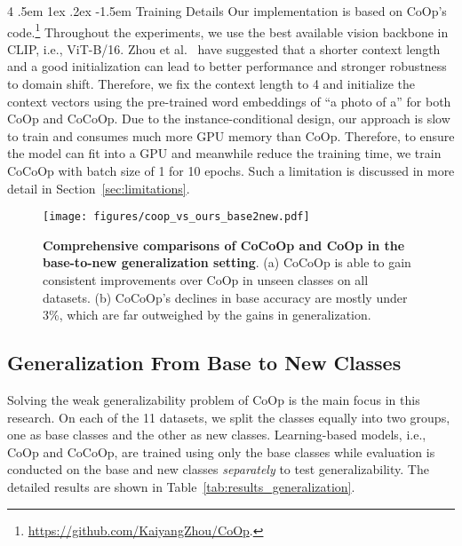 \documentclass[10pt,twocolumn,letterpaper]{article}
\makeatletter
\renewcommand\paragraph{
  \@startsection{paragraph} {4} {\z@} {.5em \@plus1ex \@minus.2ex} {-1.5em} {\normalfont\normalsize\bfseries} }
\makeatother
\begin{document}
\paragraph{Training Details}
Our implementation is based on CoOp's code.\footnote{\url{https://github.com/KaiyangZhou/CoOp}.} Throughout the experiments, we use the best available vision backbone in CLIP, i.e., ViT-B/16. Zhou et al.~\cite{zhou2021coop} have suggested that a shorter context length and a good initialization can lead to better performance and stronger robustness to domain shift. Therefore, we fix the context length to 4 and initialize the context vectors using the pre-trained word embeddings of ``a photo of a'' for both CoOp and CoCoOp. Due to the instance-conditional design, our approach is slow to train and consumes much more GPU memory than CoOp. Therefore, to ensure the model can fit into a GPU and meanwhile reduce the training time, we train CoCoOp with batch size of 1 for 10 epochs. Such a limitation is discussed in more detail in Section~\ref{sec:limitations}.


\begin{figure*}[t]
    \centering
    \texttt{[image: figures/coop\_vs\_ours\_base2new.pdf]}
    \caption{\textbf{Comprehensive comparisons of CoCoOp and CoOp in the base-to-new generalization setting}. (a) CoCoOp is able to gain consistent improvements over CoOp in unseen classes on all datasets. (b) CoCoOp's declines in base accuracy are mostly under 3\%, which are far outweighed by the gains in generalization.}
    \label{fig:coop_vs_ours_base2new}
\end{figure*}



\subsection{Generalization From Base to New Classes}
\label{sec:experiments;subsec:base2new}

Solving the weak generalizability problem of CoOp is the main focus in this research. On each of the 11 datasets, we split the classes equally into two groups, one as base classes and the other as new classes. Learning-based models, i.e., CoOp and CoCoOp, are trained using only the base classes while evaluation is conducted on the base and new classes \emph{separately} to test generalizability. The detailed results are shown in Table~\ref{tab:results_generalization}.
\end{document}
